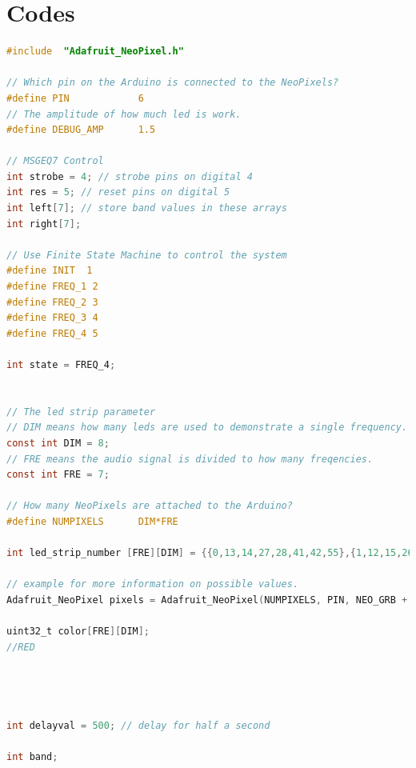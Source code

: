 \documentclass[12pt,a4paper,journal]{IEEEtran}
\begin{document}
\appendices
\section{Codes}

\begin{lstlisting}[language={C}, caption=main.cpp, keywordstyle=\color{blue!70}, commentstyle=\color{red!50!green!50!blue!50}, rulesepcolor=\color{red!20!green!20!blue!20}]
#include  "Adafruit_NeoPixel.h"

// Which pin on the Arduino is connected to the NeoPixels?
#define PIN            6
// The amplitude of how much led is work.
#define DEBUG_AMP      1.5

// MSGEQ7 Control
int strobe = 4; // strobe pins on digital 4
int res = 5; // reset pins on digital 5
int left[7]; // store band values in these arrays
int right[7];

// Use Finite State Machine to control the system
#define INIT  1
#define FREQ_1 2
#define FREQ_2 3
#define FREQ_3 4
#define FREQ_4 5

int state = FREQ_4;


// The led strip parameter
// DIM means how many leds are used to demonstrate a single frequency.
const int DIM = 8;
// FRE means the audio signal is divided to how many freqencies.
const int FRE = 7; 

// How many NeoPixels are attached to the Arduino?
#define NUMPIXELS      DIM*FRE

int led_strip_number [FRE][DIM] = {{0,13,14,27,28,41,42,55},{1,12,15,26,29,40,43,54},{2,11,16,25,30,39,44,53},{3,10,17,24,31,38,45,52},{4,9,18,23,32,37,46,51},{5,8,19,22,33,36,47,50},{6,7,20,21,34,35,48,49}};

// example for more information on possible values.
Adafruit_NeoPixel pixels = Adafruit_NeoPixel(NUMPIXELS, PIN, NEO_GRB + NEO_KHZ800);

uint32_t color[FRE][DIM];
//RED




int delayval = 500; // delay for half a second

int band;


\end{lstlisting}
\end{document}
